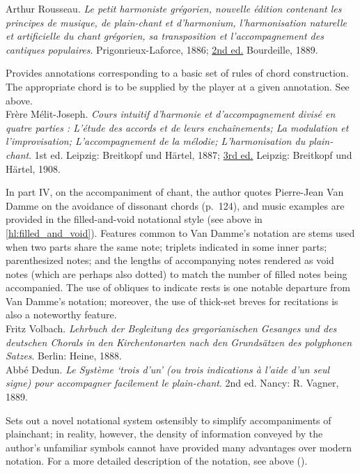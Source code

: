     \parindent=0pt
    \hangindent=0pt
  Arthur Rousseau. \emph{Le petit harmoniste grégorien, nouvelle édition contenant les principes de musique, de plain-chant et d'harmonium, l'harmonisation naturelle et artificielle du chant grégorien, sa transposition et l'accompagnement des cantiques populaires}. Prigonrieux-Laforce, 1886;  \underline{2nd ed.} Bourdeille, 1889.

     \parindent=20pt
     \hangindent=20pt
     Provides annotations corresponding to a basic set of rules of chord construction. The appropriate chord is to be supplied by the player at a given annotation. See  above.\\

    \parindent=0pt
    \hangindent=0pt
  Frère Mélit-Joseph. \emph{Cours intuitif d'harmonie et d'accompagnement divisé en quatre parties : L'étude des accords et de leurs enchaînements; La modulation et l'improvisation; L'accompagnement de la mélodie; L'harmonisation du plain-chant}. 1st ed. Leipzig:  Breitkopf und Härtel, 1887;  \underline{3rd ed.} Leipzig:  Breitkopf und Härtel, 1908.

     \parindent=20pt
     \hangindent=20pt
     In part IV, on the accompaniment of chant, the author quotes Pierre-Jean Van Damme on the avoidance of dissonant chords (p.~124), and music examples are provided in the filled-and-void notational style (see above in \cref{hl:filled_and_void}). Features common to Van Damme's notation are stems used when two parts share the same note; triplets indicated in some inner parts; parenthesized notes; and the lengths of accompanying notes rendered as void notes (which are perhaps also dotted) to match the number of filled notes being accompanied. The use of obliques to indicate rests is one notable departure from Van Damme's notation; moreover, the use of thick-set breves for recitations is also a noteworthy feature.\\

    \parindent=0pt
    \hangindent=0pt
  \covid{}Fritz Volbach. \emph{Lehrbuch der Begleitung des gregorianischen Gesanges und des deutschen Chorals in den Kirchentonarten nach den Grundsätzen des polyphonen Satzes}. Berlin:  Heine, 1888. \\

    \parindent=0pt
    \hangindent=0pt
  Abbé Dedun. \emph{Le Système `trois d'un' (ou trois indications à l'aide d'un seul signe) pour accompagner facilement le plain-chant}. 2nd ed. Nancy:  R. Vagner, 1889.

     \parindent=20pt
     \hangindent=20pt
     Sets out a novel notational system ostensibly to simplify accompaniments of plainchant; in reality, however, the density of information conveyed by the author's unfamiliar symbols cannot have provided many advantages over modern notation. For a more detailed description of the notation, see above ().\\

